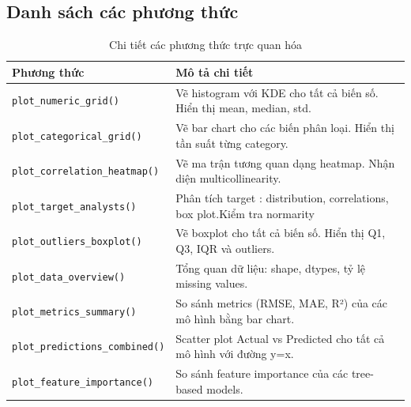 \documentclass[12pt,a4paper]{article}
\begin{document}
\subsection{Danh sách các phương thức}

\begin{table}[H]
\centering
\caption{Chi tiết các phương thức trực quan hóa}
\label{tab:visualizer_methods}

\renewcommand{\arraystretch}{1.35}
\small

\begin{tabular}{|>{\raggedright\arraybackslash}p{4.8cm}|p{8.5cm}|}
\hline
\textbf{Phương thức} & \textbf{Mô tả chi tiết} \\
\hline

\texttt{plot\_numeric\_grid()} &
Vẽ histogram với KDE cho tất cả biến số. Hiển thị mean, median, std. \\
\hline

\texttt{plot\_categorical\_grid()} &
Vẽ bar chart cho các biến phân loại. Hiển thị tần suất từng category. \\
\hline

\texttt{plot\_correlation\_heatmap()} &
Vẽ ma trận tương quan dạng heatmap. Nhận diện multicollinearity. \\
\hline

\texttt{plot\_target\_analysts()} & 
Phân tích target : distribution, correlations, box plot.Kiểm tra normarity \\
\hline


\texttt{plot\_outliers\_boxplot()} &
Vẽ boxplot cho tất cả biến số. Hiển thị Q1, Q3, IQR và outliers. \\
\hline

\texttt{plot\_data\_overview()} &
Tổng quan dữ liệu: shape, dtypes, tỷ lệ missing values. \\
\hline

\texttt{plot\_metrics\_summary()} &
So sánh metrics (RMSE, MAE, R²) của các mô hình bằng bar chart. \\
\hline

\texttt{plot\_predictions\_\allowbreak combined()} &
Scatter plot Actual vs Predicted cho tất cả mô hình với đường y=x. \\
\hline

\texttt{plot\_feature\_importance()} &
So sánh feature importance của các tree-based models. \\
\hline

\end{tabular}
\end{table}
\end{document}
